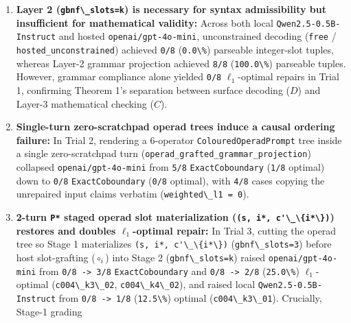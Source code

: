 \documentclass[
  11pt,
]{article}
\newcommand{\passthrough}[1]{#1}
\providecommand{\tightlist}{%
  \setlength{\itemsep}{0pt}\setlength{\parskip}{0pt}}
\begin{document}
\begin{enumerate}
\def\labelenumi{\arabic{enumi}.}
\tightlist
\item
  \textbf{Layer 2 (\passthrough{\lstinline!gbnf\_slots=k!}) is necessary
  for syntax admissibility but insufficient for mathematical validity:}
  Across both local \nolinkurl{Qwen2.5-0.5B-Instruct} and hosted
  \nolinkurl{openai/gpt-4o-mini}, unconstrained decoding
  (\passthrough{\lstinline!free!} / \nolinkurl{hosted_unconstrained})
  achieved \passthrough{\lstinline!0/8!}
  (\passthrough{\lstinline!0.0\%!}) parseable integer-slot tuples,
  whereas Layer-2 grammar projection achieved
  \passthrough{\lstinline!8/8!} (\passthrough{\lstinline!100.0\%!})
  parseable tuples. However, grammar compliance alone yielded
  \passthrough{\lstinline!0/8!} \(\ell_1\)-optimal repairs in Trial 1,
  confirming Theorem 1's separation between surface decoding (\(D\)) and
  Layer-3 mathematical checking (\(C\)).
\item
  \textbf{Single-turn zero-scratchpad operad trees induce a causal
  ordering failure:} In Trial 2, rendering a 6-operator
  \nolinkurl{ColouredOperadPrompt} tree inside a single zero-scratchpad
  turn (\nolinkurl{operad_grafted_grammar_projection}) collapsed
  \nolinkurl{openai/gpt-4o-mini} from \passthrough{\lstinline!5/8!}
  \nolinkurl{ExactCoboundary} (\passthrough{\lstinline!1/8!} optimal)
  down to \passthrough{\lstinline!0/8!} \nolinkurl{ExactCoboundary}
  (\passthrough{\lstinline!0/8!} optimal), with
  \passthrough{\lstinline!4/8!} cases copying the unrepaired input
  claims verbatim (\passthrough{\lstinline!weighted\_l1 = 0!}).
\item
  \textbf{2-turn \passthrough{\lstinline!P*!} staged operad slot
  materialization (\passthrough{\lstinline!(s, i*, c'\_\{i*\})!})
  restores and doubles \(\ell_1\)-optimal repair:} In Trial 3, cutting
  the operad tree so Stage 1 materializes
  \passthrough{\lstinline!(s, i*, c'\_\{i*\})!}
  (\passthrough{\lstinline!gbnf\_slots=3!}) before host slot-grafting
  (\(\circ_i\)) into Stage 2 (\passthrough{\lstinline!gbnf\_slots=k!})
  raised \nolinkurl{openai/gpt-4o-mini} from
  \passthrough{\lstinline!0/8 -> 3/8!} \nolinkurl{ExactCoboundary} and
  \passthrough{\lstinline!0/8 -> 2/8!}
  (\passthrough{\lstinline!25.0\%!}) \(\ell_1\)-optimal
  (\passthrough{\lstinline!c004\_k3\_02!},
  \passthrough{\lstinline!c004\_k4\_02!}), and raised local
  \nolinkurl{Qwen2.5-0.5B-Instruct} from
  \passthrough{\lstinline!0/8 -> 1/8!}
  (\passthrough{\lstinline!12.5\%!}) optimal
  (\passthrough{\lstinline!c004\_k3\_01!}). Crucially, Stage-1 grading

\end{enumerate}
\end{document}
